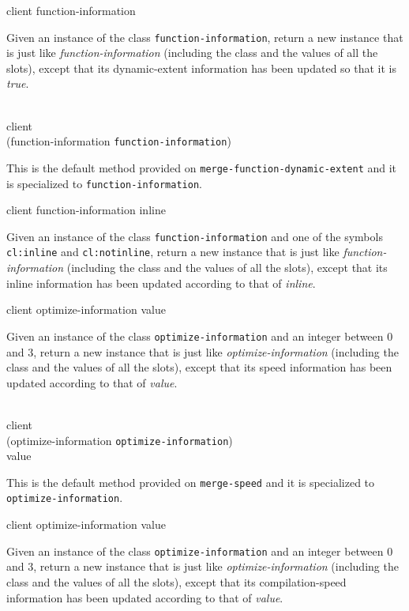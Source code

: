  {client function-information}

Given an instance of the class \texttt{function-information}, return a
new instance that is just like \textit{function-information}
(including the class and the values of all the slots), except that its
dynamic-extent information has been updated so that it is \emph{true}.

\\
           {client\\
            (function-information {\tt function-information})}

This is the default method provided on
\texttt{merge-function-dynamic-extent} and it is specialized to
\texttt{function-information}.

 {client function-information inline}

Given an instance of the class \texttt{function-information} and one
of the symbols \texttt{cl:inline} and \texttt{cl:notinline},
return a new instance that is just like
\textit{function-information} (including the class and the values of
all the slots), except that its inline information has been updated
according to that of \textit{inline}.

 {client optimize-information value}

Given an instance of the class \texttt{optimize-information} and an
integer between $0$ and $3$, return a new instance that is just like
\textit{optimize-information} (including the class and the values of
all the slots), except that its speed information has been updated
according to that of \textit{value}.

\\
           {client\\
            (optimize-information {\tt optimize-information})\\
            value}

This is the default method provided on \texttt{merge-speed} and it is
specialized to \texttt{optimize-information}.

 {client optimize-information value}

Given an instance of the class \texttt{optimize-information} and an
integer between $0$ and $3$, return a new instance that is just like
\textit{optimize-information} (including the class and the values of
all the slots), except that its compilation-speed information has been
updated according to that of \textit{value}.

